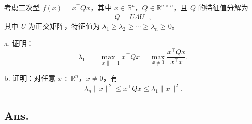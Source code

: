 \begin{example}
    考虑二次型 \( f(x) = x^\top Qx \)，其中 \( x \in \mathbb{R}^n \)，\( Q \in \mathbb{R}^{n \times n} \)，且 \( Q \) 的特征值分解为  
    \[
    Q = U\Lambda U^\top,
    \]
    其中 \( U \) 为正交矩阵，特征值为 \( \lambda_1 \geq \lambda_2 \geq \cdots \geq \lambda_n \geq 0 \)。

    a. 证明：
    \[
    \lambda_1 = \max_{\|x\|=1} x^\top Qx = \max_{x \neq 0} \frac{x^\top Qx}{x^\top x}.
    \]

    b. 证明：对任意 \( x \in \mathbb{R}^n \)，\( x \neq 0 \)，有
    \[
    \lambda_n \|x\|^2 \leq x^\top Qx \leq \lambda_1 \|x\|^2.
    \]
    \end{example}

    
    \subsection*{Ans.}
    